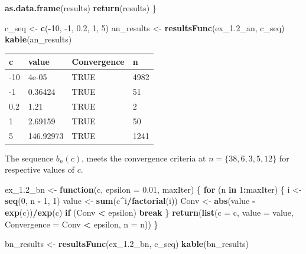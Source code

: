 \documentclass[12pt,]{article}
\newenvironment{Shaded}{\begin{snugshade}}{\end{snugshade}}
\newcommand{\ControlFlowTok}[1]{\textcolor[rgb]{0.13,0.29,0.53}{\textbf{#1}}}
\newcommand{\DataTypeTok}[1]{\textcolor[rgb]{0.13,0.29,0.53}{#1}}
\newcommand{\DecValTok}[1]{\textcolor[rgb]{0.00,0.00,0.81}{#1}}
\newcommand{\FloatTok}[1]{\textcolor[rgb]{0.00,0.00,0.81}{#1}}
\newcommand{\KeywordTok}[1]{\textcolor[rgb]{0.13,0.29,0.53}{\textbf{#1}}}
\newcommand{\NormalTok}[1]{#1}
\newcommand{\OperatorTok}[1]{\textcolor[rgb]{0.81,0.36,0.00}{\textbf{#1}}}
\newcommand{\StringTok}[1]{\textcolor[rgb]{0.31,0.60,0.02}{#1}}
\begin{document}
\begin{Shaded}
\begin{Highlighting}[]
    \KeywordTok{as.data.frame}\NormalTok{(results)}
    \KeywordTok{return}\NormalTok{(results)}
\NormalTok{\}}

\NormalTok{c_seq <-}\StringTok{ }\KeywordTok{c}\NormalTok{(}\OperatorTok{-}\DecValTok{10}\NormalTok{, }\DecValTok{-1}\NormalTok{, }\FloatTok{0.2}\NormalTok{, }\DecValTok{1}\NormalTok{, }\DecValTok{5}\NormalTok{)}
\NormalTok{an_results <-}\StringTok{ }\KeywordTok{resultsFunc}\NormalTok{(ex_}\FloatTok{1.2}\NormalTok{_an, c_seq)}
\KeywordTok{kable}\NormalTok{(an_results)}
\end{Highlighting}
\end{Shaded}

\begin{longtable}[]{@{}llll@{}}
\toprule
c & value & Convergence & n\tabularnewline
\midrule
\endhead
-10 & 4e-05 & TRUE & 4982\tabularnewline
-1 & 0.36424 & TRUE & 51\tabularnewline
0.2 & 1.21 & TRUE & 2\tabularnewline
1 & 2.69159 & TRUE & 50\tabularnewline
5 & 146.92973 & TRUE & 1241\tabularnewline
\bottomrule
\end{longtable}

\newpage

The sequence \(b_n(c)\), meets the convergence criteria at
\(n = \{38,6,3,5,12\}\) for respective values of \(c\).

\begin{Shaded}
\begin{Highlighting}[]
\NormalTok{ex_}\FloatTok{1.2}\NormalTok{_bn <-}\StringTok{ }\ControlFlowTok{function}\NormalTok{(c, }\DataTypeTok{epsilon =} \FloatTok{0.01}\NormalTok{, maxIter) \{}
    \ControlFlowTok{for}\NormalTok{ (n }\ControlFlowTok{in} \DecValTok{1}\OperatorTok{:}\NormalTok{maxIter) \{}
\NormalTok{        i <-}\StringTok{ }\KeywordTok{seq}\NormalTok{(}\DecValTok{0}\NormalTok{, n }\OperatorTok{-}\StringTok{ }\DecValTok{1}\NormalTok{, }\DecValTok{1}\NormalTok{)}
\NormalTok{        value <-}\StringTok{ }\KeywordTok{sum}\NormalTok{(c}\OperatorTok{^}\NormalTok{i}\OperatorTok{/}\KeywordTok{factorial}\NormalTok{(i))}
\NormalTok{        Conv <-}\StringTok{ }\KeywordTok{abs}\NormalTok{(value }\OperatorTok{-}\StringTok{ }\KeywordTok{exp}\NormalTok{(c))}\OperatorTok{/}\KeywordTok{exp}\NormalTok{(c)}
        \ControlFlowTok{if}\NormalTok{ (Conv }\OperatorTok{<}\StringTok{ }\NormalTok{epsilon) }
            \ControlFlowTok{break}
\NormalTok{    \}}
    \KeywordTok{return}\NormalTok{(}\KeywordTok{list}\NormalTok{(}\DataTypeTok{c =}\NormalTok{ c, }\DataTypeTok{value =}\NormalTok{ value, }\DataTypeTok{Convergence =}\NormalTok{ Conv }\OperatorTok{<}\StringTok{ }
\StringTok{        }\NormalTok{epsilon, }\DataTypeTok{n =}\NormalTok{ n))}
\NormalTok{\}}

\NormalTok{bn_results <-}\StringTok{ }\KeywordTok{resultsFunc}\NormalTok{(ex_}\FloatTok{1.2}\NormalTok{_bn, c_seq)}
\KeywordTok{kable}\NormalTok{(bn_results)}
\end{Highlighting}
\end{Shaded}
\end{document}
